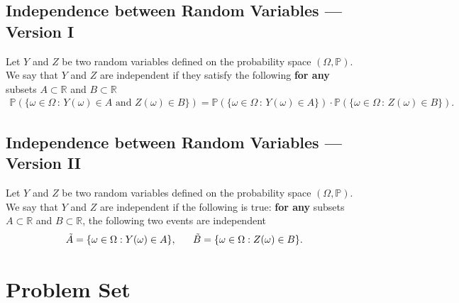 \documentclass[11pt]{article}
\newcommand{\1}{\mathbbm{1}}
\begin{document}
\subsection{Independence between Random Variables --- Version I}

Let $Y$ and $Z$ be two random variables defined on the probability space $(\Omega,\mathbb{P})$. We say that $Y$ and $Z$ are independent if they satisfy the following \textbf{for any} subsets $A\subset\mathbb{R}$ and $B\subset\mathbb{R}$
    \begin{align*}
       \boxed{ \mathbb{P}\left(\{\omega\in\Omega \,:\, Y(\omega)\in A \text{ and }Z(\omega)\in B\}\right) = \mathbb{P}\left(\{\omega\in\Omega \,:\, Y(\omega)\in A \}\right) \cdot \mathbb{P}\left(\{\omega\in\Omega \,:\, Z(\omega)\in B\}\right).}
    \end{align*}

\subsection{Independence between Random Variables --- Version II}

Let $Y$ and $Z$ be two random variables defined on the probability space $(\Omega,\mathbb{P})$. We say that $Y$ and $Z$ are independent if the following is true: \textbf{for any} subsets $A\subset \mathbb{R}$ and $B\subset \mathbb{R}$, the following two events are independent
    \begin{align*}
        \Tilde{A}=\{\omega\in\Omega: Y(\omega)\in A\},\ \ \ \ \ \Tilde{B}=\{\omega\in\Omega: Z(\omega)\in B\}.
    \end{align*}

\section{Problem Set}
\end{document}
